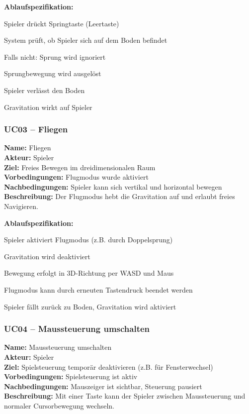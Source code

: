 \documentclass{article}
\begin{document}
\textbf{Ablaufspezifikation:}
\begin{description}[style=nextline,leftmargin=1.5cm,labelwidth=1.2cm]
  \item[1.] Spieler drückt Springtaste (Leertaste)
  \item[2.] System prüft, ob Spieler sich auf dem Boden befindet
  \item[2a.] Falls nicht: Sprung wird ignoriert
  \item[3.] Sprungbewegung wird ausgelöst
  \item[3.1.] Spieler verlässt den Boden
  \item[3.2.] Gravitation wirkt auf Spieler
\end{description}

\subsubsection*{UC03 – Fliegen}

\textbf{Name:} Fliegen \\
\textbf{Akteur:} Spieler \\
\textbf{Ziel:} Freies Bewegen im dreidimensionalen Raum \\
\textbf{Vorbedingungen:} Flugmodus wurde aktiviert \\
\textbf{Nachbedingungen:} Spieler kann sich vertikal und horizontal bewegen \\
\textbf{Beschreibung:} Der Flugmodus hebt die Gravitation auf und erlaubt freies Navigieren.

\textbf{Ablaufspezifikation:}
\begin{description}[style=nextline,leftmargin=1.5cm,labelwidth=1.2cm]
  \item[1.] Spieler aktiviert Flugmodus (z.B. durch Doppelsprung)
  \item[2.] Gravitation wird deaktiviert
  \item[3.] Bewegung erfolgt in 3D-Richtung per WASD und Maus
  \item[4.] Flugmodus kann durch erneuten Tastendruck beendet werden
  \item[4a.] Spieler fällt zurück zu Boden, Gravitation wird aktiviert
\end{description}

\subsubsection*{UC04 – Maussteuerung umschalten}

\textbf{Name:} Maussteuerung umschalten \\
\textbf{Akteur:} Spieler \\
\textbf{Ziel:} Spielsteuerung temporär deaktivieren (z.B. für Fensterwechsel) \\
\textbf{Vorbedingungen:} Spielsteuerung ist aktiv \\
\textbf{Nachbedingungen:} Mauszeiger ist sichtbar, Steuerung pausiert \\
\textbf{Beschreibung:} Mit einer Taste kann der Spieler zwischen Maussteuerung und normaler Cursorbewegung wechseln.
\end{document}
